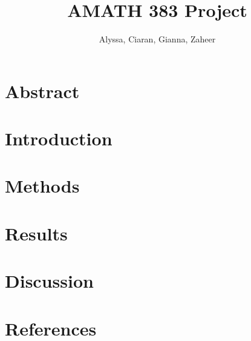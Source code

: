 \documentclass{article}
\title{AMATH 383 Project}
\author{Alyssa, Ciaran, Gianna, Zaheer}
\begin{document}
    \maketitle

    \section{Abstract}
    \section{Introduction}
    \section{Methods}
    \section{Results}
    \section{Discussion}
    \section{References}
\end{document}
